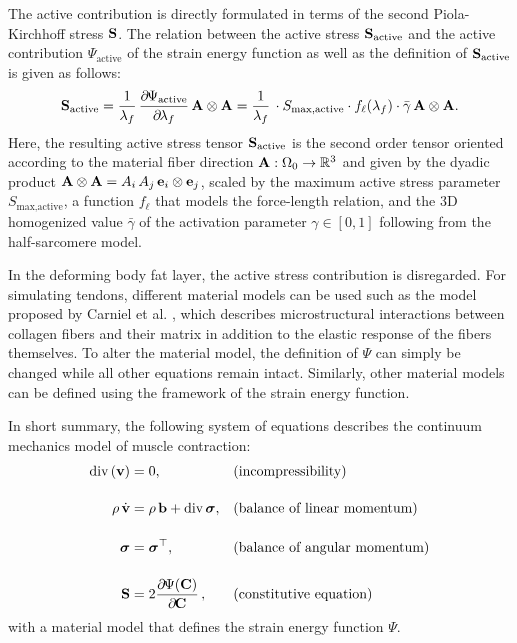 The active contribution is directly formulated in terms of the second Piola-Kirchhoff stress $\textbf{S}$. The relation between the active stress $\textbf{S}_\text{active}$ and the active contribution $\Psi_\text{active}$ of the strain energy function as well as the definition of $\textbf{S}_\text{active}$ is given as follows:
\begin{align}\label{eq:active_stress_term}
  \bfS_\text{active} = \dfrac{1}{\lambda_f}\p{\Psi_\text{active}}{\lambda_f} \bfA \otimes \bfA = \dfrac{1}{\lambda_f} \cdot S_\text{max,active}\cdot f_\ell(\lambda_f)\cdot\bar{\gamma}\, \bfA \otimes \bfA.
\end{align}
%
Here, the resulting active stress tensor $\textbf{S}_\text{active}$ is the second order tensor oriented according to the material fiber direction $\textbf{A}: \Omega_0 \to \mathbb{R}^3$ and given by the dyadic product $\textbf{A} \otimes \textbf{A} = A_{i}\,A_{j}\,\textbf{e}_i \otimes \textbf{e}_j$, scaled by the maximum active stress parameter $S_\text{max,active}$, a function $f_\ell$ that models the force-length relation, and the 3D homogenized value $\bar{\gamma}$ of the activation parameter $\gamma \in [0,1]$ following from the half-sarcomere model.

In the deforming body fat layer, the active stress contribution is disregarded. For simulating tendons, different material models can be used such as the model proposed by Carniel et al. \cite{Carniel2017}, which describes microstructural interactions between collagen fibers and their matrix in addition to the elastic response of the fibers themselves. To alter the material model, the definition of $\Psi$ can simply be changed while all other equations remain intact. Similarly, other material models can be defined using the framework of the strain energy function.

In short summary, the following system of equations describes the continuum mechanics model of muscle contraction:
%
\begin{subequations}\label{eq:contraction}
  \begin{align}
    \div(\bfv) &= 0, \qquad &&\text{(incompressibility)} \label{eq:contraction_1}\\[4mm]
    \rho\,\dot{\bfv} &= \rho\,\bfb + \div\bfsigma, && \text{(balance of linear momentum)}\label{eq:contraction_2}\\[4mm]
    \bfsigma &= \bfsigma^\top, && \text{(balance of angular momentum)}\label{eq:contraction_3}\\[4mm]
    \bfS &= 2\p{\Psi(\bfC)}{\bfC}, && \text{(constitutive equation)}\label{eq:contraction_4}
  \end{align}
\end{subequations}
with a material model that defines the strain energy function $\Psi$.

